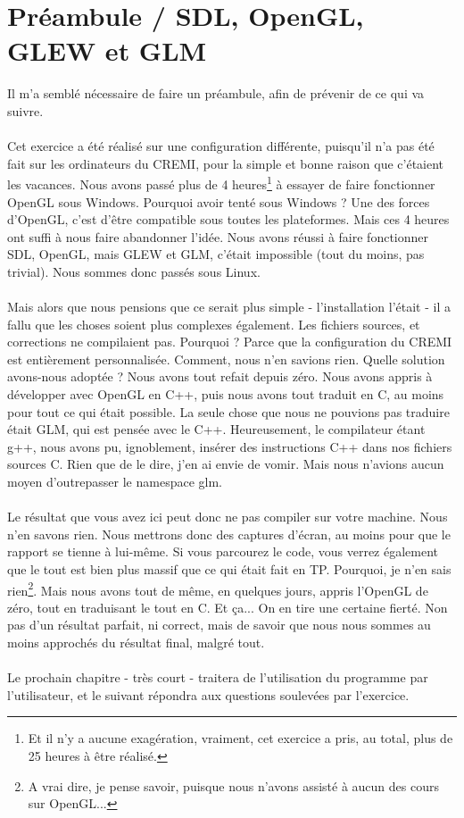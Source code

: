 \chapter[Préambule]{Préambule / SDL, OpenGL, GLEW et GLM}
Il m'a semblé nécessaire de faire un préambule, afin de prévenir de ce qui va suivre.
\\\\
Cet exercice a été réalisé sur une configuration différente, puisqu'il n'a pas été fait sur les ordinateurs du CREMI, pour la simple et bonne raison que c'étaient les vacances. Nous avons passé plus de 4 heures\footnote{Et il n'y a aucune exagération, vraiment, cet exercice a pris, au total, plus de 25 heures à être réalisé.} à essayer de faire fonctionner OpenGL sous Windows. Pourquoi avoir tenté sous Windows ? Une des forces d'OpenGL, c'est d'être compatible sous toutes les plateformes. Mais ces 4 heures ont suffi à nous faire abandonner l'idée. Nous avons réussi à faire fonctionner SDL, OpenGL, mais GLEW et GLM, c'était impossible (tout du moins, pas trivial). Nous sommes donc passés sous Linux.
\\\\
Mais alors que nous pensions que ce serait plus simple - l'installation l'était - il a fallu que les choses soient plus complexes également. Les fichiers sources, et corrections ne compilaient pas. Pourquoi ? Parce que la configuration du CREMI est entièrement personnalisée. Comment, nous n'en savions rien. Quelle solution avons-nous adoptée ? Nous avons tout refait depuis zéro. Nous avons appris à développer avec OpenGL en C++, puis nous avons tout traduit en C, au moins pour tout ce qui était possible. La seule chose que nous ne pouvions pas traduire était GLM, qui est pensée avec le C++. Heureusement, le compilateur étant g++, nous avons pu, ignoblement, insérer des instructions C++ dans nos fichiers sources C. Rien que de le dire, j'en ai envie de vomir. Mais nous n'avions aucun moyen d'outrepasser le namespace glm.
\\\\
Le résultat que vous avez ici peut donc ne pas compiler sur votre machine. Nous n'en savons rien. Nous mettrons donc des captures d'écran, au moins pour que le rapport se tienne à lui-même. Si vous parcourez le code, vous verrez également que le tout est bien plus massif que ce qui était fait en TP. Pourquoi, je n'en sais rien\footnote{A vrai dire, je pense savoir, puisque nous n'avons assisté à aucun des cours sur OpenGL...}. Mais nous avons tout de même, en quelques jours, appris l'OpenGL de zéro, tout en traduisant le tout en C. Et ça... On en tire une certaine fierté. Non pas d'un résultat parfait, ni correct, mais de savoir que nous nous sommes au moins approchés du résultat final, malgré tout.
\\\\
Le prochain chapitre - très court - traitera de l'utilisation du programme par l'utilisateur, et le suivant répondra aux questions soulevées par l'exercice.